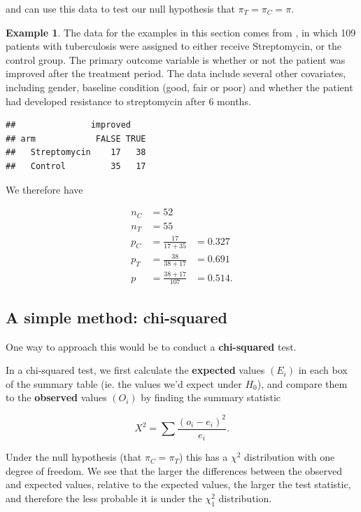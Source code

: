 \documentclass[
  openany]{book}
\theoremstyle{definition}
\theoremstyle{definition}
\newtheorem{example}{Example}[chapter]
\theoremstyle{definition}
\theoremstyle{definition}
\theoremstyle{remark}
\begin{document}
and can use this data to test our null hypothesis that \(\pi_T  = \pi_C = \pi\).

\begin{example}
\protect\hypertarget{exm:ex-bin1}{}\label{exm:ex-bin1}The data for the examples in this section comes from \citet{strep_tb}, in which 109 patients with tuberculosis were assigned to either receive Streptomycin, or the control group. The primary outcome variable is whether or not the patient was improved after the treatment period. The data include several other covariates, including gender, baseline condition (good, fair or poor) and whether the patient had developed resistance to streptomycin after 6 months.

\begin{verbatim}
##               improved
## arm            FALSE TRUE
##   Streptomycin    17   38
##   Control         35   17
\end{verbatim}

We therefore have

\[
\begin{aligned}
n_C & = 52 \\
n_T & = 55 \\
p_C & = \frac{17}{17+35} & = 0.327\\
p_T & = \frac{38}{38+17} & = 0.691\\
p & = \frac{38+17}{107} &= 0.514. 
\end{aligned}
\]
\end{example}

\subsection{A simple method: chi-squared}\label{a-simple-method-chi-squared}

One way to approach this would be to conduct a \textbf{chi-squared} test.

In a chi-squared test, we first calculate the \textbf{expected} values \(\left(E_i\right)\) in each box of the summary table (ie. the values we'd expect under \(H_0\)), and compare them to the \textbf{observed} values \(\left(O_i\right)\) by finding the summary statistic

\[ X^2 = \sum \frac{\left(o_i - e_i\right)^2}{e_i}.\]

Under the null hypothesis (that \(\pi_C = \pi_T\)) this has a \(\chi^2\) distribution with one degree of freedom. We see that the larger the differences between the observed and expected values, relative to the expected values, the larger the test statistic, and therefore the less probable it is under the \(\chi^2_1\) distribution.
\end{document}

